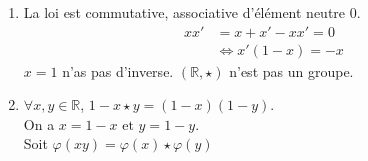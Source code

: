 	\begin{enumerate}
		\item La loi est commutative, associative d'élément neutre 0.
		\begin{align*}
			xx'& = x+x'-xx'= 0\\
			   & \Leftrightarrow x'(1-x)=-x
		\end{align*}
		$x=1$ n'as pas d'inverse. $(\mathbb{R},\star)$ n'est pas un groupe.
		\item $\forall x,y \in \mathbb{R}$, $1-x \star y = (1-x)(1-y)$.
		\\On a $x=1-x \text{ et } y=1-y$.
		\\Soit $\varphi(xy)=\varphi(x) \star \varphi(y)$
	\end{enumerate}
